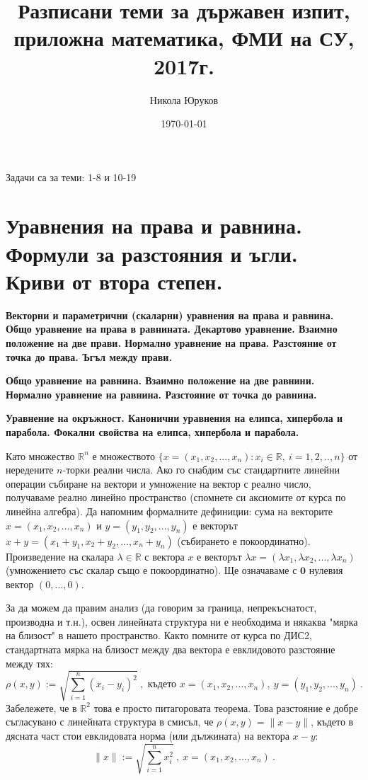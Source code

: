 \documentclass[11pt]{article}
\title{Разписани теми за държавен изпит, приложна математика, ФМИ на СУ, 2017г.}
\author{Никола Юруков}
\date{\today}
\numberwithin{equation}{section}
\numberwithin{figure}{section}
\numberwithin{table}{section}
\theoremstyle{plain}
\theoremstyle{definition}
\theoremstyle{remark}
\theoremstyle{definition}
\theoremstyle{remark}
\theoremstyle{plain}
\theoremstyle{definition}
\theoremstyle{definition}
\theoremstyle{plain}
\theoremstyle{plain}
\theoremstyle{plain}
\theoremstyle{definition}
\theoremstyle{plain}
\renewcommand*{\Vec}[1]{\mathbf{#1}}
\newcommand*{\Z}{\Vec{0}}
\begin{document}
\maketitle

\clearpage

\tableofcontents

\clearpage

Задачи са за теми: 1-8 и 10-19

\section{Уравнения на права и равнина. Формули за разстояния и ъгли. Криви от втора степен.}

\textbf{Векторни и параметрични (скаларни) уравнения на права и равнина. Общо уравнение на права в равнината. Декартово уравнение. Взаимно положение на две прави. Нормално уравнение на права. Разстояние от точка до права. Ъгъл между прави.}

\textbf{Общо уравнение на равнина. Взаимно положение на две равнини. Нормално уравнение на равнина. Разстояние от точка до равнина.}

\textbf{Уравнение на окръжност. Канонични уравнения на елипса, хипербола и парабола. Фокални свойства на елипса, хипербола и парабола.}

Като множество $\mathbb{R}^n$ е множеството $\{x = (x_1, x_2, ..., x_n): x_i \in \mathbb{R}, \  i=1,2,..,n\}$ от нередените $n$-торки реални числа. Ако го снабдим със стандартните линейни операции събиране на вектори и умножение на вектор с реално число, получаваме реално линейно пространство (спомнете си аксиомите от курса по линейна алгебра). Да напомним формалните дефиниции: сума на векторите $x = (x_1, x_2, ..., x_n)$ и $y = (y_1, y_2, ..., y_n)$ е векторът $x+y = (x_1+y_1, x_2+y_2, ..., x_n + y_n)$ (събирането е покоординатно). Произведение на скалара $\lambda \in \mathbb{R}$ с вектора $x$ е векторът $\lambda x = (\lambda x_1, \lambda x_2, ..., \lambda x_n)$ (умножението със скалар също е покоординатно). Ще означаваме с $\Z$ нулевия вектор $(0,\dots ,0)$.

За да можем да правим анализ (да говорим за граница, непрекъснатост, производна и т.н.), освен линейната структура ни е необходима и някаква "мярка на близост" в нашето пространство. Както помните от курса по ДИС2, стандартната мярка на близост  между два вектора е евклидовото разстояние между тях:
 $$\rho(x,y):= \sqrt{\sum_{i=1}^n (x_i-y_i)^2} \ , \mbox{ където } x = (x_1, x_2, ..., x_n), \ y = (y_1, y_2, ..., y_n) \ .$$
 Забележете, че в $\mathbb{R}^2$ това е просто питагоровата теорема. Това разстояние е добре съгласувано с линейната структура в смисъл, че $\rho(x,y)=\lVert x - y\rVert$, където в дясната част стои евклидовата норма (или дължината) на вектора $x-y$:
 $$\lVert x\rVert := \sqrt{\sum_{i=1}^n x_i^2}\ , \ x = (x_1, x_2, ..., x_n) \ .$$
\end{document}
